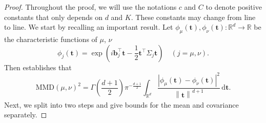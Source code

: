 \documentclass{article} %
\theoremstyle{plain}
\theoremstyle{definition}
\theoremstyle{remark}
\newcommand{\R}{\mathbb{R}}
\newcommand{\norm}[2][H^s]{\left\|#2\right\|_{#1}}
\newcommand{\bt}{\mathbf{t}}
\newcommand{\bb}{\mathbf{b}}
\newcommand{\rd}{\mathrm{d}}
\newcommand{\MMD}{\mathrm{MMD}}
\newcommand{\tp}{^{\top}}
\newcommand{\parentheses}[1]{\left(#1\right)}
\newcommand{\abs}[1]{\left|#1\right|}
\begin{document}
\begin{proof}
Throughout the proof, we will use the notations $c$ and $C$ to denote positive constants that only depends on $d$ and $K$. These constants may change from line to line. We start by recalling an important result. Let $\phi_\mu(\bt), \phi_\nu(\bt):\R^d \to \R$ be the characteristic functions of $\mu$, $\nu$
$$\phi_j(\bt) = \exp\parentheses{i \bb_j\tp \bt - \frac12 \bt\tp \Sigma_j \bt} \quad (j=\mu,\nu).$$
Then \cite[Proposition 1]{szekely2013energy} establishes that
\begin{equation}\label{eq:MMD_Fourier}
\MMD(\mu,\nu)^2 = \Gamma\parentheses{\frac{d+1}{2}} \pi^{-\frac{d+1}{2}} \int_{\R^d} \dfrac{\abs{\phi_\mu(\bt) - \phi_\nu(\bt)}^2}{\norm[]{\bt}^{d+1}} \,\rd \bt.
\end{equation}
Next, we split into two steps and give bounds for the mean and covariance separately.


\end{proof}
\end{document}
